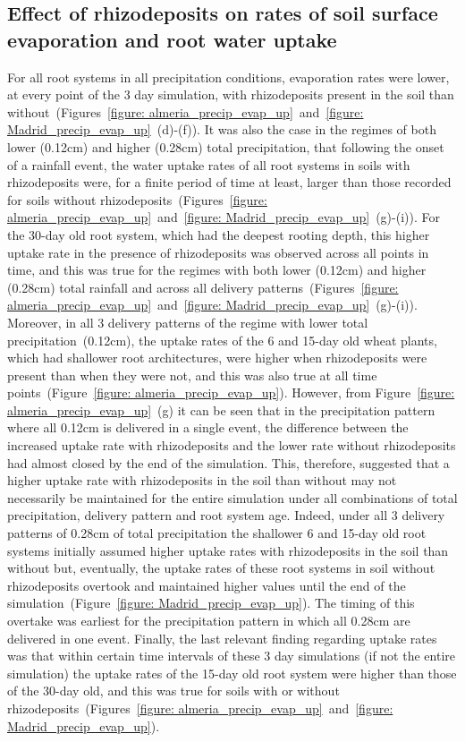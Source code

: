 \documentclass[11pt,a4paper]{article}
\numberwithin{equation}{section}
\begin{document}
\subsection{Effect of rhizodeposits on rates of soil surface evaporation and root water uptake}
For all root systems in all precipitation conditions, evaporation rates were lower, at every point of the 3 day simulation, with rhizodeposits present in the soil than without~(Figures~\ref{figure: almeria_precip_evap_up}~and~\ref{figure: Madrid_precip_evap_up}~(d)-(f)). It was also the case in the regimes of both lower (0.12cm) and higher (0.28cm) total precipitation, that following the onset of a rainfall event, the water uptake rates of all root systems in soils with rhizodeposits were, for a finite period of time at least, larger than those recorded for soils without rhizodeposits~(Figures~\ref{figure: almeria_precip_evap_up}~and~\ref{figure: Madrid_precip_evap_up}~(g)-(i)). For the 30-day old root system, which had the deepest rooting depth, this higher uptake rate in the presence of rhizodeposits was observed across all points in time, and this was true for the regimes with both lower (0.12cm) and higher (0.28cm) total rainfall and across all delivery patterns~(Figures~\ref{figure: almeria_precip_evap_up}~and~\ref{figure: Madrid_precip_evap_up}~(g)-(i)). Moreover, in all 3 delivery patterns of the regime with lower total precipitation~(0.12cm), the uptake rates of the 6 and 15-day old wheat plants, which had shallower root architectures, were higher when rhizodeposits were present than when they were not, and this was also true at all time points~(Figure~\ref{figure: almeria_precip_evap_up}). However, from Figure~\ref{figure: almeria_precip_evap_up}~(g) it can be seen that in the precipitation pattern where all 0.12cm is delivered in a single event, the difference between the increased uptake rate with rhizodeposits and the lower rate without rhizodeposits had almost closed by the end of the simulation. This, therefore, suggested that a higher uptake rate with rhizodeposits in the soil than without may not necessarily be maintained for the entire simulation under all combinations of total precipitation, delivery pattern and root system age. Indeed, under all 3 delivery patterns of 0.28cm of total precipitation the shallower 6 and 15-day old root systems initially assumed higher uptake rates with rhizodeposits in the soil than without but, eventually, the uptake rates of these root systems in soil without rhizodeposits overtook and maintained higher values until the end of the simulation~(Figure~\ref{figure: Madrid_precip_evap_up}). The timing of this overtake was earliest for the precipitation pattern in which all 0.28cm are delivered in one event. Finally, the last relevant finding regarding uptake rates was that within certain time intervals of these 3 day simulations (if not the entire simulation) the uptake rates of the 15-day old root system were higher than those of the 30-day old, and this was true for soils with or without rhizodeposits~(Figures~\ref{figure: almeria_precip_evap_up}~and~\ref{figure: Madrid_precip_evap_up}).
\end{document}
